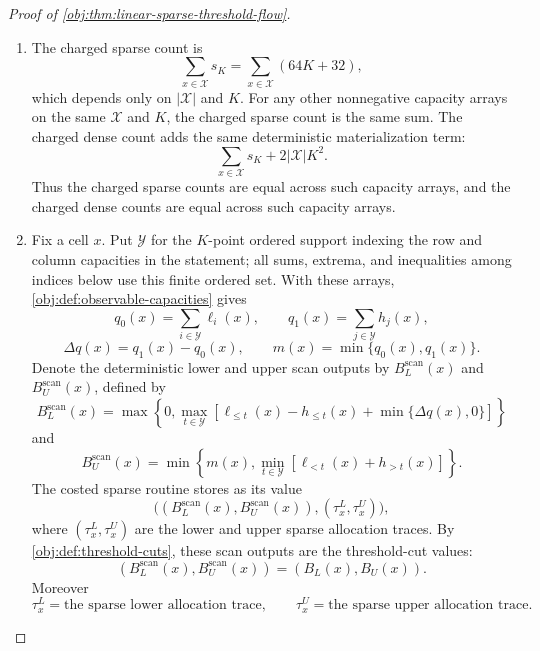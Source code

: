 \begin{proof}[Proof of \cref{obj:thm:linear-sparse-threshold-flow}]
\begin{enumerate}
\item The charged sparse count is
\[
\sum_{x\in\mathcal X}s_K=\sum_{x\in\mathcal X}(64K+32),
\]
which depends only on \(|\mathcal X|\) and \(K\).  For any other nonnegative capacity arrays on the same \(\mathcal X\) and \(K\), the charged sparse count is the same sum.  The charged dense count adds the same deterministic materialization term:
\[
\sum_{x\in\mathcal X}s_K+2|\mathcal X|K^2 .
\]
Thus the charged sparse counts are equal across such capacity arrays, and the charged dense counts are equal across such capacity arrays.

\item Fix a cell \(x\).  Put \(\mathcal Y\) for the \(K\)-point ordered support indexing the row and column capacities in the statement; all sums, extrema, and inequalities among indices below use this finite ordered set.  With these arrays, \cref{obj:def:observable-capacities} gives
\[
q_0(x)=\sum_{i\in\mathcal Y}\ell_i(x),
\qquad
q_1(x)=\sum_{j\in\mathcal Y}h_j(x),
\]
\[
\Delta q(x)=q_1(x)-q_0(x),
\qquad
m(x)=\min\{q_0(x),q_1(x)\}.
\]
Denote the deterministic lower and upper scan outputs by \(B_L^{\mathrm{scan}}(x)\) and \(B_U^{\mathrm{scan}}(x)\), defined by
\[
B_L^{\mathrm{scan}}(x)
=
\max\left\{0,\max_{t\in\mathcal Y}
\left[\ell_{\le t}(x)-h_{\le t}(x)+\min\{\Delta q(x),0\}\right]\right\}
\]
and
\[
B_U^{\mathrm{scan}}(x)
=
\min\left\{m(x),\min_{t\in\mathcal Y}
\left[\ell_{<t}(x)+h_{>t}(x)\right]\right\}.
\]
The costed sparse routine stores as its value
\[
\bigl((B_L^{\mathrm{scan}}(x),B_U^{\mathrm{scan}}(x)),
       (\tau_x^L,\tau_x^U)\bigr),
\]
where \((\tau_x^L,\tau_x^U)\) are the lower and upper sparse allocation traces.  By \cref{obj:def:threshold-cuts}, these scan outputs are the threshold-cut values:
\[
(B_L^{\mathrm{scan}}(x),B_U^{\mathrm{scan}}(x))=(B_L(x),B_U(x)).
\]
Moreover
\[
\tau_x^L=\text{the sparse lower allocation trace},
\qquad
\tau_x^U=\text{the sparse upper allocation trace}.
\]


\end{enumerate}
\end{proof}
